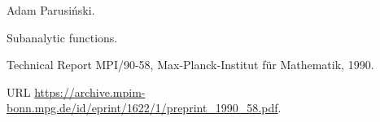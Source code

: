 Adam Parusi{\'n}ski.

\newblock Subanalytic functions.

\newblock Technical Report MPI/90-58, Max-Planck-Institut f{\"u}r Mathematik,
  1990.

\newblock URL
  \url{https://archive.mpim-bonn.mpg.de/id/eprint/1622/1/preprint_1990_58.pdf}.
